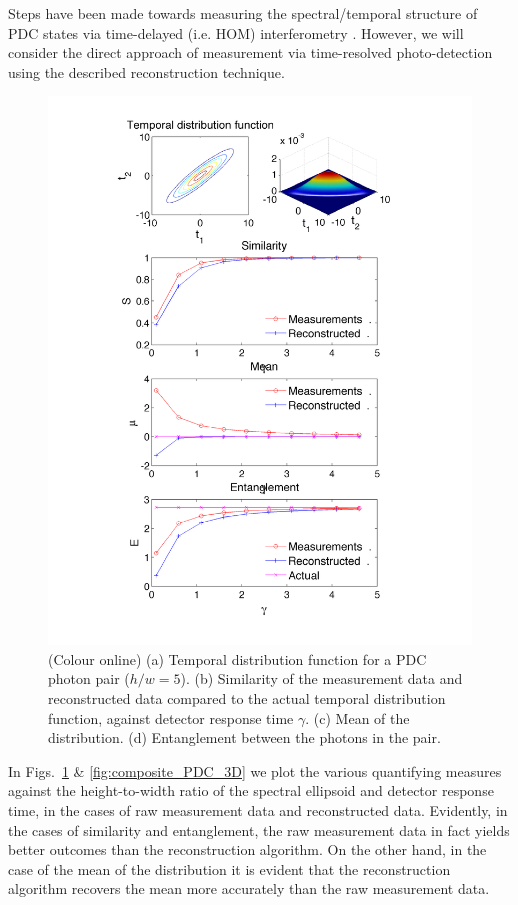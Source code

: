 \documentclass[aps,pra,twocolumn,amsmath,amssymb,color,superscriptaddress]{revtex4}
\begin{document}
Steps have been made towards measuring the spectral/temporal structure of PDC states via time-delayed (i.e. HOM) interferometry \cite{bib:YoonHo03}. However, we will consider the direct approach of measurement via time-resolved photo-detection using the described reconstruction technique.

\begin{figure}[!htb]
\includegraphics[width=\columnwidth]{figures/composite_PDC}
\caption{(Colour online) (a) Temporal distribution function for a PDC photon pair (\mbox{$h/w=5$}). (b) Similarity of the measurement data and reconstructed data compared to the actual temporal distribution function, against detector response time $\gamma$. (c) Mean of the distribution. (d) Entanglement between the photons in the pair.} \label{fig:composite_PDC}
\end{figure}

In Figs.~\ref{fig:composite_PDC} \& \ref{fig:composite_PDC_3D} we plot the various quantifying measures against the height-to-width ratio of the spectral ellipsoid and detector response time, in the cases of raw measurement data and reconstructed data. Evidently, in the cases of similarity and entanglement, the raw measurement data in fact yields better outcomes than the reconstruction algorithm. On the other hand, in the case of the mean of the distribution it is evident that the reconstruction algorithm recovers the mean more accurately than the raw measurement data.
\end{document}
